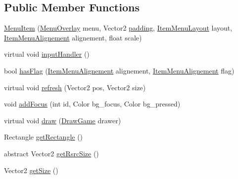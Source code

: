 \subsection*{Public Member Functions}
\begin{DoxyCompactItemize}
\item 
\hyperlink{classgearit_1_1src_1_1utility_1_1_menu_1_1_menu_item_a326609ea034555884144fc07d06f1ab5}{Menu\+Item} (\hyperlink{classgearit_1_1src_1_1utility_1_1_menu_1_1_menu_overlay}{Menu\+Overlay} menu, Vector2 \hyperlink{classgearit_1_1src_1_1utility_1_1_menu_1_1_menu_item_ae2a8172ef48a64fbb99dfca22e9995ab}{padding}, \hyperlink{namespacegearit_1_1src_1_1utility_1_1_menu_a3ca3e98c7e2f44227e0fd6263822c56a}{Item\+Menu\+Layout} layout, \hyperlink{namespacegearit_1_1src_1_1utility_1_1_menu_a4312fcb06a1685782d1246bfeefdbd3b}{Item\+Menu\+Alignement} alignement, float scale)
\item 
virtual void \hyperlink{classgearit_1_1src_1_1utility_1_1_menu_1_1_menu_item_af3f72f5b26c24237f48426a7d36aa156}{input\+Handler} ()
\item 
bool \hyperlink{classgearit_1_1src_1_1utility_1_1_menu_1_1_menu_item_a87fd36a85d656aecdf82335e7ef9c270}{has\+Flag} (\hyperlink{namespacegearit_1_1src_1_1utility_1_1_menu_a4312fcb06a1685782d1246bfeefdbd3b}{Item\+Menu\+Alignement} alignement, \hyperlink{namespacegearit_1_1src_1_1utility_1_1_menu_a4312fcb06a1685782d1246bfeefdbd3b}{Item\+Menu\+Alignement} flag)
\item 
virtual void \hyperlink{classgearit_1_1src_1_1utility_1_1_menu_1_1_menu_item_aa9a32ba195bcfbb60f9bb1c455f1c3b9}{refresh} (Vector2 pos, Vector2 size)
\item 
void \hyperlink{classgearit_1_1src_1_1utility_1_1_menu_1_1_menu_item_a8065a3a6d468eee69ae73b0f5e244477}{add\+Focus} (int id, Color bg\+\_\+focus, Color bg\+\_\+pressed)
\item 
virtual void \hyperlink{classgearit_1_1src_1_1utility_1_1_menu_1_1_menu_item_a5a44f7b864cf66ae93fbe41cc5c282e0}{draw} (\hyperlink{classgearit_1_1src_1_1_draw_game}{Draw\+Game} drawer)
\item 
Rectangle \hyperlink{classgearit_1_1src_1_1utility_1_1_menu_1_1_menu_item_ad13d3664da18594bd7e5871e0f615c5a}{get\+Rectangle} ()
\item 
abstract Vector2 \hyperlink{classgearit_1_1src_1_1utility_1_1_menu_1_1_menu_item_af771dcbd2bcb959fefb8d45abe0e3ee6}{get\+Rsrc\+Size} ()
\item 
Vector2 \hyperlink{classgearit_1_1src_1_1utility_1_1_menu_1_1_menu_item_a2b99799b72df0bf35563e02b21743c73}{get\+Size} ()
\end{DoxyCompactItemize}
